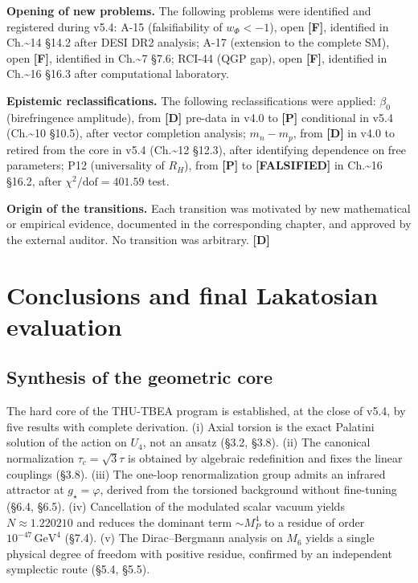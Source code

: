 ﻿\documentclass[11pt,letterpaper]{article}
\begin{document}
\textbf{Opening of new problems.} The following problems were identified and registered during v5.4: A-15 (falsifiability of $w_\Phi < -1$), open \textbf{[F]}, identified in Ch.\textasciitilde{}14 §14.2 after DESI DR2 analysis; A-17 (extension to the complete SM), open \textbf{[F]}, identified in Ch.\textasciitilde{}7 §7.6; RCI-44 (QGP gap), open \textbf{[F]}, identified in Ch.\textasciitilde{}16 §16.3 after computational laboratory.

\textbf{Epistemic reclassifications.} The following reclassifications were applied: $\beta_0$ (birefringence amplitude), from \textbf{[D]} pre-data in v4.0 to \textbf{[P]} conditional in v5.4 (Ch.\textasciitilde{}10 §10.5), after vector completion analysis; $m_n - m_p$, from \textbf{[D]} in v4.0 to retired from the core in v5.4 (Ch.\textasciitilde{}12 §12.3), after identifying dependence on free parameters; P12 (universality of $R_H$), from \textbf{[P]} to \textbf{[FALSIFIED]} in Ch.\textasciitilde{}16 §16.2, after $\chi^2/\text{dof} = 401{.}59$ test.

\textbf{Origin of the transitions.} Each transition was motivated by new mathematical or empirical evidence, documented in the corresponding chapter, and approved by the external auditor. No transition was arbitrary. \textbf{[D]}

\section{Conclusions and final Lakatosian evaluation}
\subsection{Synthesis of the geometric core}
The hard core of the THU-TBEA program is established, at the close of v5.4, by five results with complete derivation. (i) Axial torsion is the exact Palatini solution of the action on $U_4$, not an ansatz (§3.2, §3.8). (ii) The canonical normalization $\tau_c = \sqrt{3}\tau$ is obtained by algebraic redefinition and fixes the linear couplings (§3.8). (iii) The one-loop renormalization group admits an infrared attractor at $g_\star = \varphi$, derived from the torsioned background without fine-tuning (§6.4, §6.5). (iv) Cancellation of the modulated scalar vacuum yields $N \approx 1{.}220210$ and reduces the dominant term $\sim M_P^4$ to a residue of order $10^{-47}\,\text{GeV}^4$ (§7.4). (v) The Dirac--Bergmann analysis on $M_6$ yields a single physical degree of freedom with positive residue, confirmed by an independent symplectic route (§5.4, §5.5).
\end{document}
